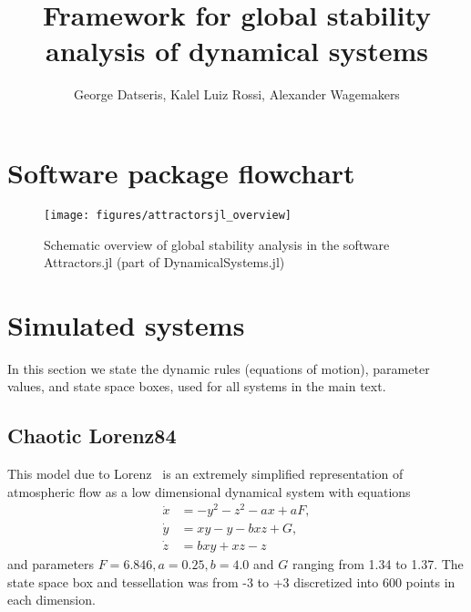 \documentclass[9pt,twoside,lineno]{pnas-new}
\title{Framework for global stability analysis of dynamical systems}
\author{George Datseris, Kalel Luiz Rossi, Alexander Wagemakers}
\begin{document}

\maketitle

\SItext


%
\section{Software package flowchart}

\begin{figure*}[!h]
\centering 
\texttt{[image: figures/attractorsjl\_overview]}
\caption{Schematic overview of global stability analysis in the software Attractors.jl (part of DynamicalSystems.jl)}
\label{fig:continuation_algorithm}
\end{figure*}


\section{Simulated systems}
In this section we state the dynamic rules (equations of motion), parameter values, and state space boxes, used for all systems in the main text.

\subsection*{Chaotic Lorenz84} This model due to Lorenz~\cite{Lorenz84} is an extremely simplified representation of atmospheric flow as a low dimensional dynamical system with equations
\begin{align*}
\dot x &= - y^2 - z^2 - ax + aF, \\
\dot y &= xy - y - bxz + G, \\
\dot z &= bxy + xz - z
\end{align*}
and parameters $F=6.846, a=0.25, b=4.0$ and $G$ ranging from 1.34 to 1.37. The state space box and tessellation was from -3 to +3 discretized into 600 points in each dimension.
\end{document}
